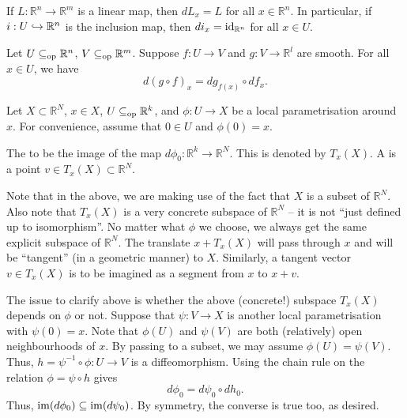 \begin{ex}
	If $L : \mathbb{R}^{n} \to \mathbb{R}^{m}$ is a linear map, then $dL_{x} = L$ for all $x \in \mathbb{R}^{n}$. \newline
	In particular, if $i : U \hookrightarrow \mathbb{R}^{n}$ is the inclusion map, then $di_{x} = \operatorname{id}_{\mathbb{R}^{n}}$ for all $x \in U$.
\end{ex}

\begin{thm}
	Let $U \subseteq_{\operatorname{op}} \mathbb{R}^{n}$, $V \subseteq_{\operatorname{op}} \mathbb{R}^{m}$. Suppose $f : U \to V$ and $g : V \to \mathbb{R}^{l}$ are smooth. For all $x \in U$, we have
	\begin{equation*} 
		d(g \circ f)_{x} = dg_{f(x)} \circ df_{x}.
	\end{equation*}
\end{thm}

\begin{defn}
	Let $X \subset \mathbb{R}^{N}$, $x \in X$, $U \subseteq_{\operatorname{op}} \mathbb{R}^{k}$, and $\phi : U \to X$ be a local parametrisation around $x$. For convenience, assume that $0 \in U$ and $\phi(0) = x$.

	The  to be the image of the map $d \phi_{0} : \mathbb{R}^{k} \to \mathbb{R}^{N}$. This is denoted by $T_{x}(X)$. \newline
	A  is a point $v \in T_{x}(X) \subset \mathbb{R}^{N}$.
\end{defn}

Note that in the above, we are making use of the fact that $X$ is a subset of $\mathbb{R}^{N}$. Also note that $T_{x}(X)$ is a very concrete subspace of $\mathbb{R}^{N}$ -- it is not ``just defined up to isomorphism''. No matter what $\phi$ we choose, we always get the same explicit subspace of $\mathbb{R}^{N}$. The translate $x + T_{x}(X)$ will pass through $x$ and will be ``tangent'' (in a geometric manner) to $X$. Similarly, a tangent vector $v \in T_{x}(X)$ is to be imagined as a segment from $x$ to $x + v$.

The issue to clarify above is whether the above (concrete!) subspace $T_{x}(X)$ depends on $\phi$ or not. Suppose that $\psi : V \to X$ is another local parametrisation with $\psi(0) = x$. Note that $\phi(U)$ and $\psi(V)$ are both (relatively) open neighbourhoods of $x$. By passing to a subset, we may assume $\phi(U) = \psi(V)$. Thus, $h = \psi^{-1} \circ \phi : U \to V$ is a diffeomorphism. Using the chain rule on the relation $\phi = \psi \circ h$ gives
\begin{equation*} 
	d \phi_{0} = d \psi_{0} \circ d h_{0}.
\end{equation*}
Thus, $\operatorname{im}(d \phi_{0}) \subseteq \operatorname{im}(d \psi_{0})$. By symmetry, the converse is true too, as desired.

